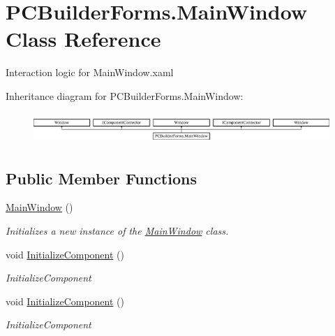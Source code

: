 \hypertarget{class_p_c_builder_forms_1_1_main_window}{}\section{P\+C\+Builder\+Forms.\+Main\+Window Class Reference}
\label{class_p_c_builder_forms_1_1_main_window}


Interaction logic for Main\+Window.\+xaml  


Inheritance diagram for P\+C\+Builder\+Forms.\+Main\+Window\+:\begin{figure}[H]
\begin{center}
\leavevmode
\includegraphics[height=1.191489cm]{class_p_c_builder_forms_1_1_main_window}
\end{center}
\end{figure}
\subsection*{Public Member Functions}
\begin{DoxyCompactItemize}
\item 
\hyperlink{class_p_c_builder_forms_1_1_main_window_a6201f6763f4ee3b2188d9ec18a9fa881}{Main\+Window} ()
\begin{DoxyCompactList}\small\item\em Initializes a new instance of the \hyperlink{class_p_c_builder_forms_1_1_main_window}{Main\+Window} class. \end{DoxyCompactList}\item 
void \hyperlink{class_p_c_builder_forms_1_1_main_window_af61d622148f662bb5060f1523fae41ae}{Initialize\+Component} ()
\begin{DoxyCompactList}\small\item\em Initialize\+Component \end{DoxyCompactList}\item 
void \hyperlink{class_p_c_builder_forms_1_1_main_window_af61d622148f662bb5060f1523fae41ae}{Initialize\+Component} ()
\begin{DoxyCompactList}\small\item\em Initialize\+Component \end{DoxyCompactList}\end{DoxyCompactItemize}
